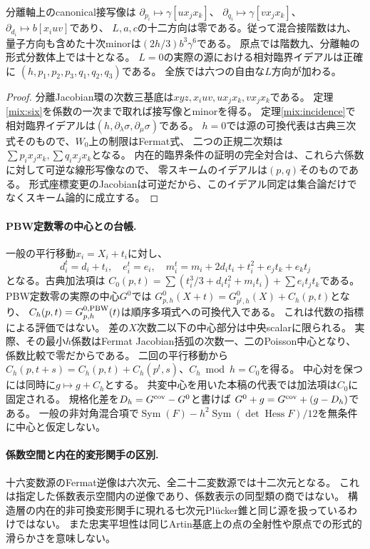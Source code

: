 \begin{corollary}[接階数と正確な臨界イデアル]
分離軸上のcanonical接写像は
$\partial_{p_i}\mapsto\gamma[ux_jx_k]$、
$\partial_{q_i}\mapsto\gamma[vx_jx_k]$、$\partial_{d_i}\mapsto b[x_iuv]$であり、
$L,a,c$の十二方向は零である。従って混合接階数は九、
量子方向も含めた十次minorは$(2h/3)b^3\gamma^6$である。
原点では階数九、分離軸の形式分数体上では十となる。
$L=0$の実際の源における相対臨界イデアルは正確に
$(h,p_1,p_2,p_3,q_1,q_2,q_3)$である。
全族では六つの自由な$L$方向が加わる。
\end{corollary}
\begin{proof}
分離Jacobian環の次数三基底は$xyz,x_iuv,ux_jx_k,vx_jx_k$である。
定理\ref{mix:six}を係数の一次まで取れば接写像とminorを得る。
定理\ref{mix:incidence}で相対臨界イデアルは$(h,\partial_\lambda\sigma,\partial_\mu\sigma)$である。
$h=0$では源の可換代表は古典三次式そのもので、$W_0$上の制限はFermat式、
二つの正規二次類は$\sum p_ix_jx_k,\sum q_ix_jx_k$となる。
内在的臨界条件の証明の完全対合は、これら六係数に対して可逆な線形写像なので、
零スキームのイデアルは$(p,q)$そのものである。
形式座標変更のJacobianは可逆だから、このイデアル同定は集合論だけでなくスキーム論的に成立する。
\end{proof}

\paragraph{PBW定数零の中心との台帳.}
一般の平行移動$x_i=X_i+t_i$に対し、
\[
 d_i^t=d_i+t_i,\quad e_i^t=e_i,\quad
 m_i^t=m_i+2d_it_i+t_i^2+e_jt_k+e_kt_j
\]
となる。古典加法項は
$C_0(p,t)=\sum(t_i^3/3+d_it_i^2+m_it_i)+\sum e_it_jt_k$である。
PBW定数零の実際の中心$G^0$では
$G^0_{p,h}(X+t)=G^0_{p^t,h}(X)+C_h(p,t)$となり、
$C_h(p,t)=G^{0,\rm PBW}_{p,h}(t)$は順序多項式への可換代入である。
これは代数の指標による評価ではない。
差の$X$次数二以下の中心部分は中央scalarに限られる。
実際、その最小$h$係数はFermat Jacobian括弧の次数一、二のPoisson中心となり、係数比較で零だからである。
二回の平行移動から
$C_h(p,t+s)=C_h(p,t)+C_h(p^t,s)$、$C_h\bmod h=C_0$を得る。
中心対を保つには同時に$g\mapsto g+C_h$とする。
共変中心を用いた本稿の代表では加法項は$C_0$に固定される。
規格化差を$D_h=G^{\rm cov}-G^0$と書けば
$G^0+g=G^{\rm cov}+(g-D_h)$である。
一般の非対角混合項で$\operatorname{Sym}(F)-h^2\operatorname{Sym}(\det\operatorname{Hess}F)/12$を無条件に中心と仮定しない。

\paragraph{係数空間と内在的変形関手の区別.}
十六変数源のFermat逆像は六次元、全二十二変数源では十二次元となる。
これは指定した係数表示空間内の逆像であり、係数表示の同型類の商ではない。
構造層の内在的非可換変形関手に現れる七次元Plücker錐と同じ源を扱っているわけではない。
また忠実平坦性は同じArtin基底上の点の全射性や原点での形式的滑らかさを意味しない。
